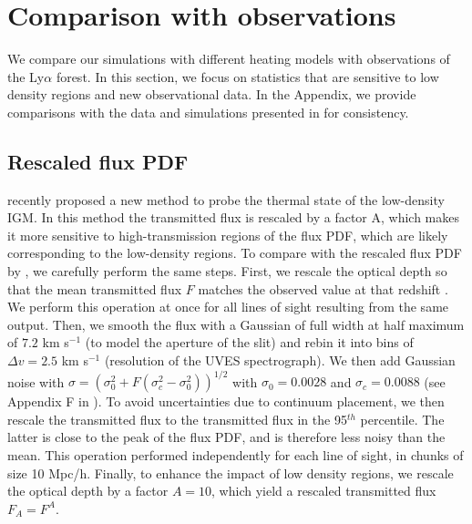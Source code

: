 \documentclass[numberedappendix]{emulateapj}
\begin{document}

\section{Comparison with observations}\label{sec:obs}
We compare our simulations with different heating models with observations of the Ly$\alpha$ forest. In this section,  we focus on statistics that are sensitive to low density regions and new observational data. In the Appendix, we provide comparisons with the data and simulations presented in  \citet{2012MNRAS.423..149P} for consistency. 

\subsection{Rescaled flux PDF}
\citet{2017MNRAS.466.2690R} recently proposed a new method to probe the thermal state of the low-density IGM.  In this method the transmitted flux is rescaled by a factor A, which makes it more sensitive to high-transmission regions of the flux PDF, which are likely corresponding to the low-density regions. To compare with the rescaled flux PDF by \citet{2017MNRAS.466.2690R}, we carefully perform the same steps. First, we rescale the optical depth so that the mean transmitted flux $F$ matches the observed value at that redshift \citep{2013MNRAS.436.1023B}. We perform this operation at once for all lines of sight resulting from the same output.  Then, we smooth the flux with a Gaussian of full width at half maximum of $7.2$ km s$^{-1}$ (to model the aperture of the slit) and rebin it into bins of $\Delta v=2.5$ km s$^{-1}$ (resolution of the UVES spectrograph). We then add Gaussian noise with $\sigma=(\sigma_0^2+F(\sigma_c^2-\sigma_0^2))^{1/2}$ with $\sigma_0=0.0028$ and $\sigma_c=0.0088$ (see Appendix F in \citet{2017MNRAS.466.2690R}). To avoid uncertainties due to continuum placement, we then rescale the transmitted flux to the transmitted flux in the 95$^{th}$ percentile. The latter is close to the peak of the flux PDF, and is therefore less noisy than the mean. This operation performed independently for each line of sight, in chunks of size 10 Mpc/h. Finally, to enhance the impact of low density regions, we rescale the optical depth by a factor $A=10$, which yield a rescaled transmitted flux $F_A=F^A$.
\end{document}
